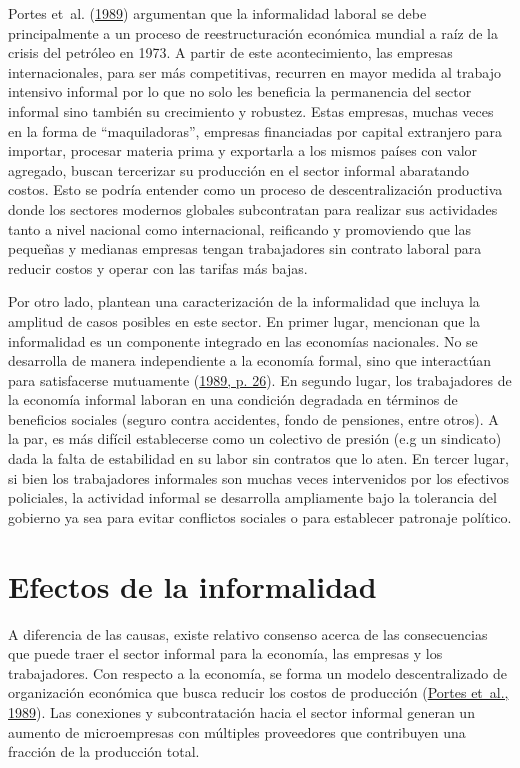 \documentclass[
  letterpaper,
  12pt,
  oneside,
  spanish,
  doublespacing,
  headsepline,
  parskip]{MastersDoctoralThesis}
\begin{document}
Portes et~al. (\protect\hyperlink{ref-theinfo1989}{1989}) argumentan que
la informalidad laboral se debe principalmente a un proceso de
reestructuración económica mundial a raíz de la crisis del petróleo en
1973. A partir de este acontecimiento, las empresas internacionales,
para ser más competitivas, recurren en mayor medida al trabajo intensivo
informal por lo que no solo les beneficia la permanencia del sector
informal sino también su crecimiento y robustez. Estas empresas, muchas
veces en la forma de ``maquiladoras'', empresas financiadas por capital
extranjero para importar, procesar materia prima y exportarla a los
mismos países con valor agregado, buscan tercerizar su producción en el
sector informal abaratando costos. Esto se podría entender como un
proceso de descentralización productiva donde los sectores modernos
globales subcontratan para realizar sus actividades tanto a nivel
nacional como internacional, reificando y promoviendo que las pequeñas y
medianas empresas tengan trabajadores sin contrato laboral para reducir
costos y operar con las tarifas más bajas.

Por otro lado, plantean una caracterización de la informalidad que
incluya la amplitud de casos posibles en este sector. En primer lugar,
mencionan que la informalidad es un componente integrado en las
economías nacionales. No se desarrolla de manera independiente a la
economía formal, sino que interactúan para satisfacerse mutuamente
(\protect\hyperlink{ref-theinfo1989}{1989, p. 26}). En segundo lugar,
los trabajadores de la economía informal laboran en una condición
degradada en términos de beneficios sociales (seguro contra accidentes,
fondo de pensiones, entre otros). A la par, es más difícil establecerse
como un colectivo de presión (e.g un sindicato) dada la falta de
estabilidad en su labor sin contratos que lo aten. En tercer lugar, si
bien los trabajadores informales son muchas veces intervenidos por los
efectivos policiales, la actividad informal se desarrolla ampliamente
bajo la tolerancia del gobierno ya sea para evitar conflictos sociales o
para establecer patronaje político.

\hypertarget{efectos-de-la-informalidad}{%
\section{Efectos de la informalidad}\label{efectos-de-la-informalidad}}

A diferencia de las causas, existe relativo consenso acerca de las
consecuencias que puede traer el sector informal para la economía, las
empresas y los trabajadores. Con respecto a la economía, se forma un
modelo descentralizado de organización económica que busca reducir los
costos de producción (\protect\hyperlink{ref-theinfo1989}{Portes et~al.,
1989}). Las conexiones y subcontratación hacia el sector informal
generan un aumento de microempresas con múltiples proveedores que
contribuyen una fracción de la producción total.
\end{document}
